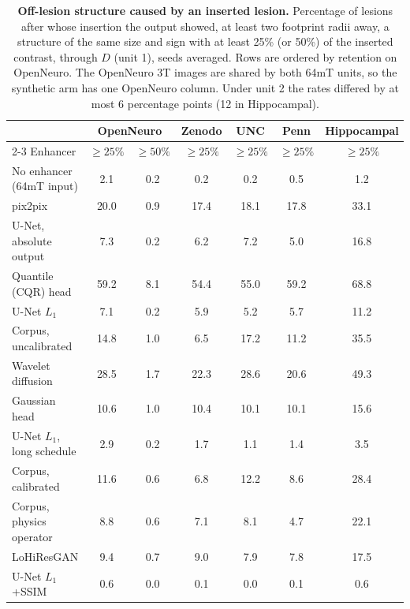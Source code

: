 \begin{table}[!htbp]
{\caption{\textbf{Off-lesion structure caused by an inserted lesion.} Percentage of lesions after whose insertion the output showed, at least two footprint radii away, a structure of the same size and sign with at least 25\% (or 50\%) of the inserted contrast, through $D$ (unit 1), seeds averaged. Rows are ordered by retention on OpenNeuro. The OpenNeuro 3T images are shared by both 64mT units, so the synthetic arm has one OpenNeuro column. Under unit 2 the rates differed by at most 6 percentage points (12 in Hippocampal).}}
{\scriptsize\setlength{\tabcolsep}{3pt}\begin{tabular*}{\linewidth}{@{\extracolsep{\fill}}lcccccc@{}}
\toprule
& \multicolumn{2}{c}{OpenNeuro} & Zenodo & UNC & Penn & Hippocampal \\
\cmidrule(lr){2-3}
Enhancer & $\geq 25\%$ & $\geq 50\%$ & $\geq 25\%$ & $\geq 25\%$ & $\geq 25\%$ & $\geq 25\%$ \\
\midrule
No enhancer (64mT input) & 2.1 & 0.2 & 0.2 & 0.2 & 0.5 & 1.2 \\
\midrule
pix2pix & 20.0 & 0.9 & 17.4 & 18.1 & 17.8 & 33.1 \\
U-Net, absolute output & 7.3 & 0.2 & 6.2 & 7.2 & 5.0 & 16.8 \\
Quantile (CQR) head & 59.2 & 8.1 & 54.4 & 55.0 & 59.2 & 68.8 \\
U-Net $L_1$ & 7.1 & 0.2 & 5.9 & 5.2 & 5.7 & 11.2 \\
Corpus, uncalibrated & 14.8 & 1.0 & 6.5 & 17.2 & 11.2 & 35.5 \\
Wavelet diffusion & 28.5 & 1.7 & 22.3 & 28.6 & 20.6 & 49.3 \\
Gaussian head & 10.6 & 1.0 & 10.4 & 10.1 & 10.1 & 15.6 \\
U-Net $L_1$, long schedule & 2.9 & 0.2 & 1.7 & 1.1 & 1.4 & 3.5 \\
Corpus, calibrated & 11.6 & 0.6 & 6.8 & 12.2 & 8.6 & 28.4 \\
Corpus, physics operator & 8.8 & 0.6 & 7.1 & 8.1 & 4.7 & 22.1 \\
LoHiResGAN & 9.4 & 0.7 & 9.0 & 7.9 & 7.8 & 17.5 \\
U-Net $L_1$+SSIM & 0.6 & 0.0 & 0.1 & 0.0 & 0.1 & 0.6 \\
\bottomrule
\end{tabular*}}
\end{table}
